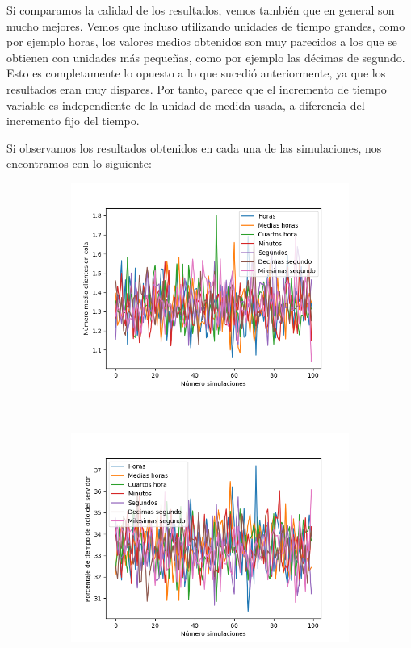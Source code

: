 \documentclass[11pt,a4paper]{article}
\begin{document}
Si comparamos la calidad de los resultados, vemos también que en general son mucho
mejores. Vemos que incluso utilizando unidades de tiempo grandes, como por ejemplo
horas, los valores medios obtenidos son muy parecidos a los que se obtienen
con unidades más pequeñas, como por ejemplo las décimas de segundo. Esto es
completamente lo opuesto a lo que sucedió anteriormente, ya que los resultados
eran muy dispares. Por tanto, parece que el incremento de tiempo variable
es independiente de la unidad de medida usada, a diferencia del incremento
fijo del tiempo.

Si observamos los resultados obtenidos en cada una de las simulaciones, nos
encontramos con lo siguiente:

\begin{figure}[H]
	\centering
	\begin{subfigure}{.5\textwidth}
		\includegraphics[scale=0.44]{img/var-q}
		\label{fig:var-q}
	\end{subfigure}%
	~
	\begin{subfigure}{.5\textwidth}
		\includegraphics[scale=0.44]{img/var-pto}
		\label{fig:var-pto}
	\end{subfigure}


\end{figure}
\end{document}
